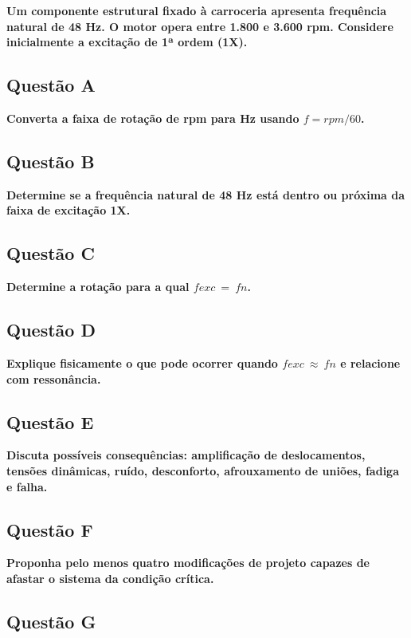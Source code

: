 \documentclass[a4paper, 12pt]{article}
\begin{document}
\textbf{Um componente estrutural fixado à carroceria apresenta frequência natural de 48 Hz. O motor opera entre 
1.800 e 3.600 rpm. Considere inicialmente a excitação de 1ª ordem (1X).} 

\subsection{Questão A}

\textbf{Converta a faixa de rotação de rpm para Hz usando $f = rpm/60$.} 

\subsection{Questão B}

\textbf{Determine se a frequência natural de 48 Hz está dentro ou próxima da faixa de excitação 1X.} 

\subsection{Questão C}

\textbf{Determine a rotação para a qual $fexc~=~fn$.}

\subsection{Questão D}

\textbf{Explique fisicamente o que pode ocorrer quando $fexc~\approx~fn$ e relacione com ressonância.} 

\subsection{Questão E}

\textbf{Discuta possíveis consequências: amplificação de deslocamentos, tensões dinâmicas, ruído, 
desconforto, afrouxamento de uniões, fadiga e falha.} 

\subsection{Questão F}

\textbf{Proponha pelo menos quatro modificações de projeto capazes de afastar o sistema da condição crítica.} 

\subsection{Questão G}
\end{document}
